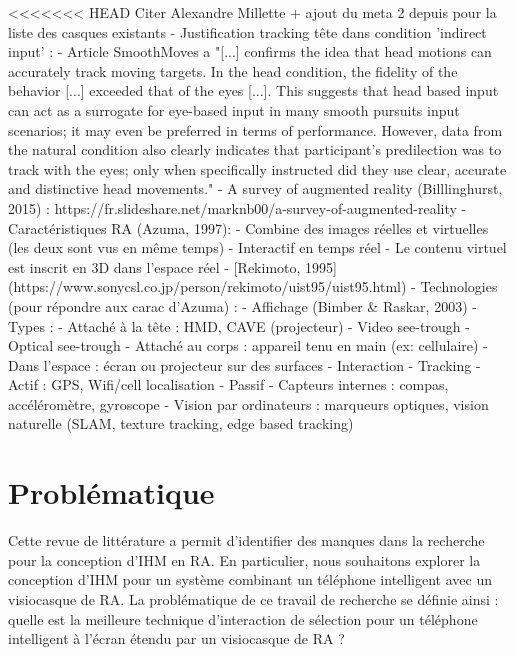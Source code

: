 <<<<<<< HEAD
Citer Alexandre Millette + ajout du meta 2 depuis pour la liste des casques existants
- Justification tracking tête dans condition 'indirect input' : 
    - Article SmoothMoves a "[...] confirms the idea that head motions can accurately track moving targets. In the head condition, the fidelity of the behavior [...] exceeded that of the eyes [...]. This suggests that head based input can act as a surrogate for eye-based input in many smooth pursuits input scenarios; it may even be preferred in terms of performance. However, data from the natural condition also clearly indicates that participant’s predilection was to track with the eyes; only when specifically instructed did they use clear, accurate and distinctive head movements."
- A survey of augmented reality (Billlinghurst, 2015) : https://fr.slideshare.net/marknb00/a-survey-of-augmented-reality
    - Caractéristiques RA (Azuma, 1997):
        - Combine des images réelles et virtuelles (les deux sont vus en même temps)
        - Interactif en temps réel
        - Le contenu virtuel est inscrit en 3D dans l'espace réel
    - [Rekimoto, 1995](https://www.sonycsl.co.jp/person/rekimoto/uist95/uist95.html)
    - Technologies (pour répondre aux carac d'Azuma) :
        - Affichage (Bimber \& Raskar, 2003)
            - Types :
                - Attaché à la tête : HMD, CAVE (projecteur)
                    - Video see-trough
                    - Optical see-trough
                - Attaché au corps : appareil tenu en main (ex: cellulaire)
                - Dans l'espace : écran ou projecteur sur des surfaces
        - Interaction
        - Tracking
            - Actif : GPS, Wifi/cell localisation
            - Passif
                - Capteurs internes : compas, accéléromètre, gyroscope
                - Vision par ordinateurs : marqueurs optiques, vision naturelle (SLAM, texture tracking, edge based tracking)


\section{Problématique}
Cette revue de littérature a permit d'identifier des manques dans la recherche pour la conception d'IHM en RA. En particulier, nous souhaitons explorer la conception d'IHM pour un système combinant un téléphone intelligent avec un visiocasque de RA. La problématique de ce travail de recherche se définie ainsi : quelle est la meilleure technique d'interaction de sélection pour un téléphone intelligent à l'écran étendu par un visiocasque de RA ?

